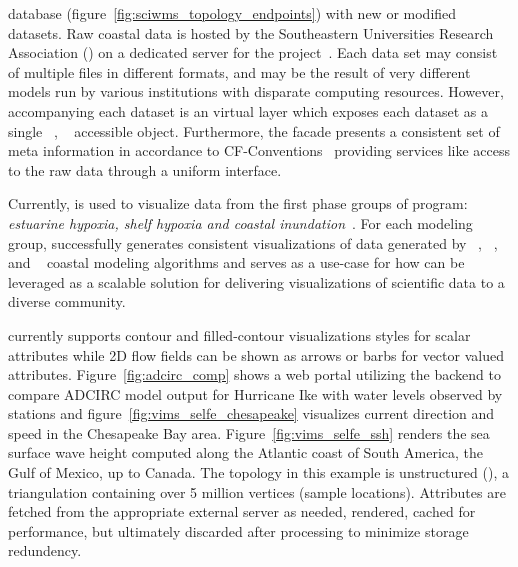 database (figure~\ref{fig:sciwms_topology_endpoints}) with new or
modified datasets. Raw coastal data is hosted by the Southeastern
Universities Research Association (\sura{}) on a dedicated server for
the \comt{} project~\cite{luettich12}. Each data set may consist of
multiple files in different formats, and may be the result of very
different models run by various institutions with disparate computing
resources. However, accompanying each dataset is an \ncml{} virtual
layer which exposes each dataset as a single \netcdf{}~\cite{netcdf},
\opendap{}~\cite{Cornillon03} accessible object. Furthermore, the
\ncml{} facade presents a consistent set of meta information in
accordance to CF-Conventions~\cite{cf} providing services like
\sciwms{} access to the raw data through a uniform interface.

Currently, \Sciwms{} is used to visualize data from the first phase
groups of \ioos{} \comt{} program: {\em estuarine hypoxia, shelf
  hypoxia and coastal inundation}~\cite{luettich13}. For each modeling
group, \sciwms{} successfully generates consistent visualizations of
data generated by \adcirc{}~\cite{adcirc}, \fvcom{}~\cite{chen06},
\selfe{}~\cite{zhang08} and \slosh{}~\cite{chen84} coastal modeling
algorithms and serves as a use-case for how \sciwms{} can be leveraged
as a scalable solution for delivering visualizations of
scientific data to a diverse community.

\sciwms{} currently supports contour and filled-contour visualizations
styles for scalar attributes while 2D flow fields can be shown as
arrows or barbs for vector valued
attributes. Figure~\ref{fig:adcirc_comp} shows a web portal utilizing
the \sciwms{} backend to compare ADCIRC model output for Hurricane Ike
with water levels observed by \noaa{} stations and
figure~\ref{fig:vims_selfe_chesapeake} visualizes current direction
and speed in the Chesapeake Bay area. Figure~\ref{fig:vims_selfe_ssh}
renders the sea surface wave height computed along the Atlantic coast
of South America, the Gulf of Mexico, up to Canada. The topology in
this example is unstructured (\ugrid{}), a triangulation containing
over 5 million vertices (sample locations). Attributes are fetched
from the appropriate external server as needed, rendered, cached for
performance, but ultimately discarded after processing to minimize
storage redundency.  

